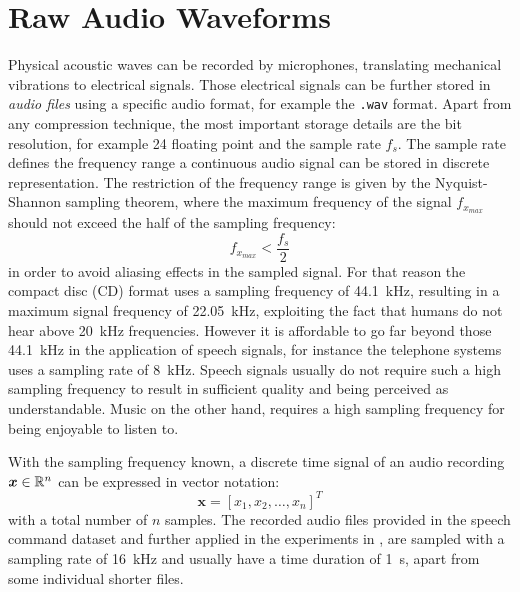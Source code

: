 
\section{Raw Audio Waveforms}\label{sec:signal_raw}
Physical acoustic waves can be recorded by microphones, translating mechanical vibrations to electrical signals. 
Those electrical signals can be further stored in \emph{audio files} using a specific audio format, for example the \texttt{.wav} format.
Apart from any compression technique, the most important storage details are the bit resolution, for example \SI{24}{\bit} floating point and the sample rate $f_s$.
The sample rate defines the frequency range a continuous audio signal can be stored in discrete representation.
The restriction of the frequency range is given by the Nyquist-Shannon sampling theorem, where the maximum frequency of the signal $f_{x_{max}}$ should not exceed the half of the sampling frequency:
\begin{equation}\label{eq:signal_raw_nyquist}
  f_{x_{max}} < \frac{f_s}{2}
\end{equation}
in order to avoid aliasing effects in the sampled signal.
For that reason the compact disc (CD) format uses a sampling frequency of \SI{44.1}{\kilo\hertz}, resulting in a maximum signal frequency of \SI{22.05}{\kilo\hertz}, exploiting the fact that humans do not hear above \SI{20}{\kilo\hertz} frequencies.
However it is affordable to go far beyond those \SI{44.1}{\kilo\hertz} in the application of speech signals, for instance the telephone systems uses a sampling rate of \SI{8}{\kilo\hertz}.
Speech signals usually do not require such a high sampling frequency to result in sufficient quality and being perceived as understandable.
Music on the other hand, requires a high sampling frequency for being enjoyable to listen to.

With the sampling frequency known, a discrete time signal of an audio recording $\bm{x} \in \mathbb{R}^n$ can be expressed in vector notation:
\begin{equation}\label{eq:signal_raw_x}
  \bm{x} = [x_1, x_2, \dots, x_n]^T
\end{equation}
with a total number of $n$ samples.
The recorded audio files provided in the speech command dataset \cite{Warden2018} and further applied in the experiments in , are sampled with a sampling rate of \SI{16}{\kilo\hertz} and usually have a time duration of \SI{1}{\second}, apart from some individual shorter files.

